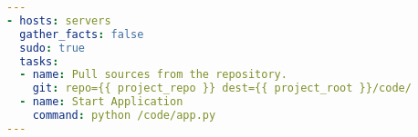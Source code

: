 \begin{lstlisting}[float,floatplacement=h,language=yaml,caption={A Simple Playbook To Deploy and Run Code},label={lst:deploy},basicstyle=\small]
---
- hosts: servers
  gather_facts: false
  sudo: true
  tasks:
  - name: Pull sources from the repository.
    git: repo={{ project_repo }} dest={{ project_root }}/code/
  - name: Start Application
    command: python /code/app.py
---
\end{lstlisting}
